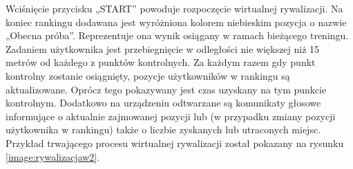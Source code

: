 Wciśnięcie przycisku „START” powoduje rozpoczęcie wirtualnej rywalizacji. Na koniec rankingu dodawana jest wyróżniona kolorem niebieskim pozycja o nazwie „Obecna próba”. Reprezentuje ona wynik osiągany w ramach bieżącego treningu. Zadaniem użytkownika jest przebiegnięcie w odległości nie większej niż 15 metrów od każdego z punktów kontrolnych. Za każdym razem gdy punkt kontrolny zostanie osiągnięty, pozycje użytkowników w rankingu są aktualizowane. Oprócz tego pokazywany jest czas uzyskany na tym punkcie kontrolnym.  Dodatkowo na urządzeniu odtwarzane są komunikaty głosowe informujące o aktualnie zajmowanej pozycji lub (w przypadku zmiany pozycji użytkownika w rankingu) także o liczbie zyskanych lub utraconych miejsc. Przykład trwającego procesu wirtualnej rywalizacji został pokazany na rysunku \ref{image:rywalizacjaw2}.

